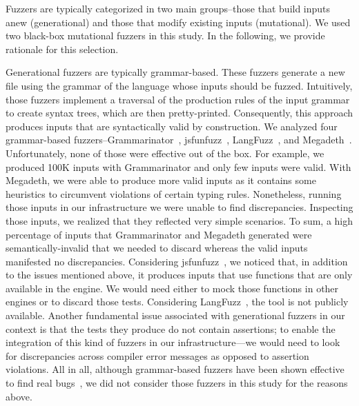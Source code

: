 \documentclass[10pt,conference,anonymous]{IEEEtran}
\begin{document}
Fuzzers are typically categorized in two main groups--those that build
inputs anew (generational) and those that modify existing inputs
(mutational). We used two black-box mutational
fuzzers
in this study. In the following, we provide rationale for this
selection.

Generational fuzzers are typically grammar-based. These fuzzers
generate a new file using the grammar of the language whose inputs
should be fuzzed. Intuitively, those fuzzers implement a traversal of
the production rules of the input grammar to create syntax trees,
which are then pretty-printed. Consequently, this approach produces
inputs that are syntactically valid by construction. We analyzed four
grammar-based fuzzers--Grammarinator~\cite{grammarinator},
jsfunfuzz~\cite{jsfunfuzz},
LangFuzz~\cite{Holler:2012:FCF:2362793.2362831}, and
Megadeth~\cite{grieco2016quickfuzz}.  Unfortunately, none of those
were effective out of the box. For example, we produced 100K inputs
with Grammarinator and only few inputs were valid. With Megadeth, we
were able to produce more valid inputs as it
contains some heuristics to circumvent violations of certain typing
rules.
Nonetheless, running those inputs in our infrastructure we were unable
to find discrepancies. Inspecting those inputs, we realized that they
reflected very simple scenarios. To sum, a high percentage of inputs
that Grammarinator and Megadeth generated were semantically-invalid
that we needed to discard whereas the valid inputs manifested no
discrepancies. Considering jsfunfuzz~\cite{jsfunfuzz}, we noticed
that, in addition to the issues mentioned above, it produces inputs
that use functions that are only available in the \smonkey{}
engine. We would need either to mock those functions in other engines
or to discard those tests. Considering
LangFuzz~\cite{Holler:2012:FCF:2362793.2362831}, the tool is not
publicly available. Another fundamental issue associated with
generational fuzzers in our context is that the tests they produce do
not contain assertions; to enable the integration of this kind of
fuzzers in our infrastructure---we would need to look for
discrepancies across compiler error messages as opposed to assertion
violations.  All in all, although grammar-based fuzzers have been
shown effective to find real
bugs~\cite{Holler:2012:FCF:2362793.2362831}, we did not consider those
fuzzers in this study for the reasons above.
\end{document}
